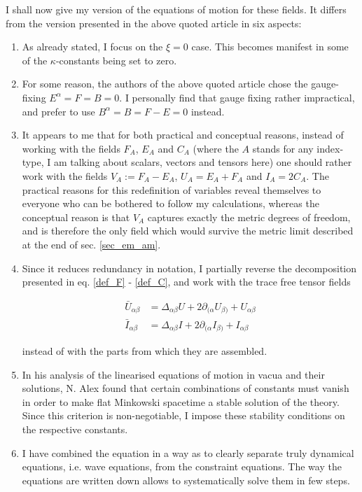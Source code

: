 \documentclass[11pt]{article}
\begin{document}
I shall now give my version of the equations of motion for these fields. It  differs from the version presented in the above quoted article in six aspects:

\begin{enumerate}
	\item As already stated, I focus on the $\xi = 0$ case. This becomes manifest in some of the $\kappa$-constants being set to zero.
	\item For some reason, the authors of the above quoted article chose the gauge-fixing $E^\alpha = F = B = 0$. I personally find that gauge fixing rather impractical, and prefer to use $B^\alpha = B = F - E = 0 $ instead.
	\item It appears to me that for both practical and conceptual reasons, instead of working with the fields $F_A$, $E_A$ and $C_A$ (where the $A$ stands for any index-type, I am talking about scalars, vectors and tensors here) one should rather work with the fields $ V_A := F_A - E_A$,  $U_A = E_A + F_A$ and $I_A = 2 C_A$. The practical reasons for this redefinition of variables reveal themselves to everyone who can be bothered to follow my calculations, whereas the conceptual reason is that $V_A$ captures exactly the metric degrees of freedom, and is therefore the only field which would survive the metric limit described at the end of sec. \ref{sec_em_am}.
	\item Since it reduces redundancy in notation, I partially reverse the decomposition presented in eq. \ref{def_F} - \ref{def_C}, and work with the trace free tensor fields 

	\begin{align}
		\bar{U}_{\alpha \beta} &= \Delta_{\alpha \beta} U
		+  2 \partial_{ ( \alpha} U_{\beta )} 
		+  U_{\alpha \beta}\\
		\bar{I}_{\alpha \beta} &= \Delta_{\alpha \beta} I
		+  2 \partial_{ ( \alpha} I_{\beta )} 
		+  I_{\alpha \beta}
	\end{align}
	
		instead of with the parts from which they are assembled.
		
	\item In his analysis of the linearised equations of motion in vacua and their solutions, N. Alex found that certain combinations of constants must vanish in order to make flat Minkowski spacetime a stable solution of the theory. Since this criterion is non-negotiable, I impose these stability conditions on the respective constants.
	\item I have combined the equation in a way as to clearly separate truly dynamical equations, i.e. wave equations, from the constraint equations. The way the equations are written down allows to systematically solve them in few steps.
\end{enumerate}
\end{document}
